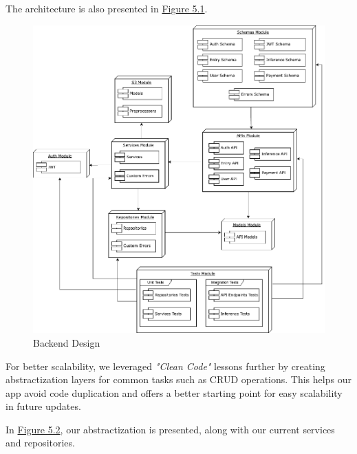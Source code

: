 The architecture is also presented in \hyperref[fig:backend-design]{Figure 5.1}.
\begin{figure}[ht]
    \centering
    \includegraphics[width=0.8\linewidth]{images/webapp/backend/backend-modules.png}
    \caption{Backend Design}
    \label{fig:backend-design}
\end{figure}

For better scalability, we leveraged \textit{"Clean Code"} lessons further by creating abstractization layers for common tasks such as CRUD operations. This helps our app avoid code duplication and offers a better starting point for easy scalability in future updates.

In \hyperref[fig:backend-repositories]{Figure 5.2}, our abstractization is presented, along with our current services and repositories.

